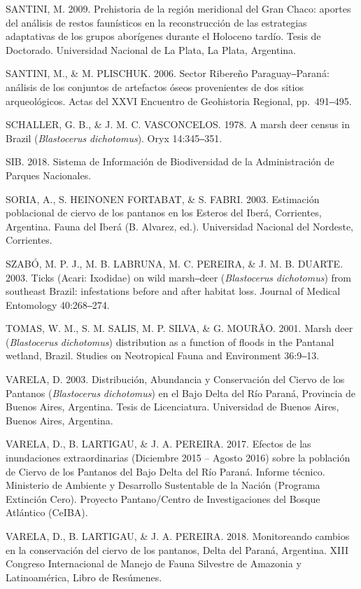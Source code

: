 \documentclass[
  x11names]{article}
\begin{document}
SANTINI, M. 2009. Prehistoria de la región meridional del Gran Chaco:
aportes del análisis de restos faunísticos en la reconstrucción de las
estrategias adaptativas de los grupos aborígenes durante el Holoceno
tardío. Tesis de Doctorado. Universidad Nacional de La Plata, La Plata,
Argentina.

SANTINI, M., \& M. PLISCHUK. 2006. Sector Ribereño Paraguay‒Paraná:
análisis de los conjuntos de artefactos óseos provenientes de dos sitios
arqueológicos. Actas del XXVI Encuentro de Geohistoria Regional,
pp.~491‒495.

SCHALLER, G. B., \& J. M. C. VASCONCELOS. 1978. A marsh deer census in
Brazil (\textit{Blastocerus} \textit{dichotomus}). Oryx 14:345‒351.

SIB. 2018. Sistema de Información de Biodiversidad de la Administración
de Parques Nacionales.

SORIA, A., S. HEINONEN FORTABAT, \& S. FABRI. 2003. Estimación
poblacional de ciervo de los pantanos en los Esteros del Iberá,
Corrientes, Argentina. Fauna del Iberá (B. Alvarez, ed.). Universidad
Nacional del Nordeste, Corrientes.

SZABÓ, M. P. J., M. B. LABRUNA, M. C. PEREIRA, \& J. M. B. DUARTE. 2003.
Ticks (Acari: Ixodidae) on wild marsh‒deer (\textit{Blastocerus}
\textit{dichotomus}) from southeast Brazil: infestations before and
after habitat loss. Journal of Medical Entomology 40:268‒274.

TOMAS, W. M., S. M. SALIS, M. P. SILVA, \& G. MOURÃO. 2001. Marsh deer
(\textit{Blastocerus} \textit{dichotomus}) distribution as a function of
floods in the Pantanal wetland, Brazil. Studies on Neotropical Fauna and
Environment 36:9‒13.

VARELA, D. 2003. Distribución, Abundancia y Conservación del Ciervo de
los Pantanos (\textit{Blastocerus} \textit{dichotomus}) en el Bajo Delta
del Río Paraná, Provincia de Buenos Aires, Argentina. Tesis de
Licenciatura. Universidad de Buenos Aires, Buenos Aires, Argentina.

VARELA, D., B. LARTIGAU, \& J. A. PEREIRA. 2017. Efectos de las
inundaciones extraordinarias (Diciembre 2015 -- Agosto 2016) sobre la
población de Ciervo de los Pantanos del Bajo Delta del Río Paraná.
Informe técnico. Ministerio de Ambiente y Desarrollo Sustentable de la
Nación (Programa Extinción Cero). Proyecto Pantano/Centro de
Investigaciones del Bosque Atlántico (CeIBA).

VARELA, D., B. LARTIGAU, \& J. A. PEREIRA. 2018. Monitoreando cambios en
la conservación del ciervo de los pantanos, Delta del Paraná, Argentina.
XIII Congreso Internacional de Manejo de Fauna Silvestre de Amazonia y
Latinoamérica, Libro de Resúmenes.
\end{document}
